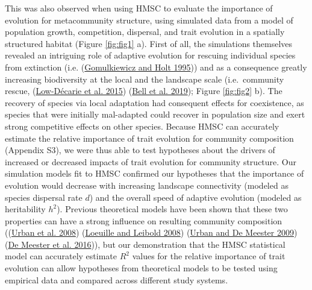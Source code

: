 \documentclass[
]{article}
\begin{document}
This was also observed when using HMSC to evaluate the importance of evolution for metacommunity structure, using simulated data from a model of population growth, competition, dispersal, and trait evolution in a spatially structured habitat (Figure \ref{fig:fig1} a). First of all, the simulations themselves revealed an intriguing role of adaptive evolution for rescuing individual species from extinction (i.e. (\protect\hyperlink{ref-Gomulkiewicz1995}{Gomulkiewicz and Holt 1995})) and as a consequence greatly increasing biodiversity at the local and the landscape scale (i.e.~community rescue, (\protect\hyperlink{ref-Low2015}{Low-Décarie et al. 2015}) (\protect\hyperlink{ref-Bell2019}{Bell et al. 2019}); Figure \ref{fig:fig2} b). The recovery of species via local adaptation had consequent effects for coexistence, as species that were initially mal-adapted could recover in population size and exert strong competitive effects on other species. Because HMSC can accurately estimate the relative importance of trait evolution for community composition (Appendix S3), we were thus able to test hypotheses about the drivers of increased or decreased impacts of trait evolution for community structure. Our simulation models fit to HMSC confirmed our hypotheses that the importance of evolution would decrease with increasing landscape connectivity (modeled as species dispersal rate \(d\)) and the overall speed of adaptive evolution (modeled as heritability \(h^2\)). Previous theoretical models have been shown that these two properties can have a strong influence on resulting community composition ((\protect\hyperlink{ref-Urban2008}{Urban et al. 2008}) (\protect\hyperlink{ref-Loeuille2008}{Loeuille and Leibold 2008}) (\protect\hyperlink{ref-Urban2009}{Urban and De Meester 2009}) (\protect\hyperlink{ref-DeMeester2016}{De Meester et al. 2016})), but our demonstration that the HMSC statistical model can accurately estimate \(R^2\) values for the relative importance of trait evolution can allow hypotheses from theoretical models to be tested using empirical data and compared across different study systems.
\end{document}
